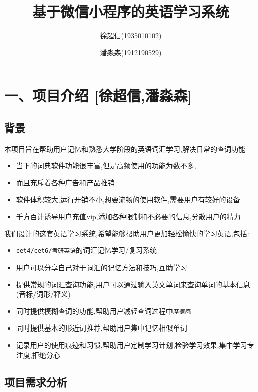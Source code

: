 \documentclass[
]{article}
\title{基于微信小程序的英语学习系统}
\author{徐超信(1935010102) \and 潘淼森(1912190529)\\}
\date{}
\begin{document}
\maketitle

\hypertarget{ux4e00ux9879ux76eeux4ecbux7ecd-ux5f90ux8d85ux4fe1ux6f58ux6dfcux68ee}{%
\section{一、项目介绍
{[}徐超信,潘淼森{]}}\label{ux4e00ux9879ux76eeux4ecbux7ecd-ux5f90ux8d85ux4fe1ux6f58ux6dfcux68ee}}

\hypertarget{ux80ccux666f}{%
\subsection{背景}\label{ux80ccux666f}}

本项目旨在帮助用户记忆和熟悉大学阶段的英语词汇学习,解决日常的查词功能

\begin{itemize}
\item
  当下的词典软件功能很丰富,但是高频使用的功能为数不多,
\item
  而且充斥着各种广告和产品推销
\item
  软件体积较大,运行开销不小,想要流畅的使用软件,需要用户有较好的设备
\item
  千方百计诱导用户充值vip,添加各种限制和不必要的信息,分散用户的精力
\end{itemize}

我们设计的这套英语学习系统,希望能够帮助用户更加轻松愉快的学习英语,\uline{包括}:

\begin{itemize}
\item
  \texttt{cet4/cet6/考研英语}的词汇记忆学习/复习系统
\item
  用户可以分享自己对于词汇的记忆方法和技巧,互助学习
\item
  提供常规的词汇查询功能,用户可以通过输入英文单词来查询单词的基本信息(音标/词形/释义)
\item
  同时提供模糊查词的功能,帮助用户减轻查词过程中\texttt{摩擦感}
\item
  同时提供基本的形近词推荐,帮助用户集中记忆相似单词
\item
  记录用户的使用痕迹和习惯,帮助用户定制学习计划,检验学习效果,集中学习专注度,拒绝分心
\end{itemize}

\hypertarget{ux9879ux76eeux9700ux6c42ux5206ux6790}{%
\subsection{项目需求分析}\label{ux9879ux76eeux9700ux6c42ux5206ux6790}}
\end{document}
